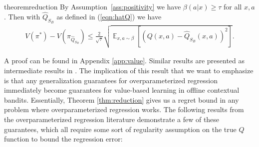 
\begin{restatable}{theorem}{reduction}\label{thm:reduction}
By Assumption~\ref{ass:positivity} we have $ \beta(a|x) \geq \tau$ for all $ x,a$. Then with $ \hat Q_{S_B}$ as defined in (\ref{eqn:hatQ}) we have
\begin{align*}
    V(\pi^*) - V(\pi_{\hat Q_{S_B}}) \leq \frac{2}{\sqrt{\tau}} \sqrt{\mathop{\mathbb{E}}_{x, a \sim \beta}[(Q(x,a) - \hat Q_{S_B}(x,a))^2]}.
\end{align*}
\end{restatable}

A proof can be found in Appendix \ref{app:value}. Similar results are presented as intermediate results in \citet{chen2019information, munos2008finite}.
The implication of this result that we want to emphasize is that any generalization guarantees for overparameterized regression immediately become guarantees for value-based learning in offline contextual bandits. Essentially, Theorem \ref{thm:reduction} gives us a regret bound in any problem where overparameterized regression works.
The following results from the overparameterized regression literature demonstrate a few of these guarantees, which all require some sort of regularity assumption on the true $Q$ function to bound the regression error:




